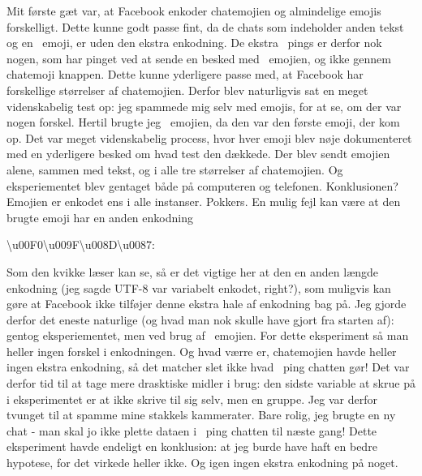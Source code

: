 \begin{article}
Mit første gæt var, at Facebook enkoder chatemojien og almindelige emojis forskelligt. Dette kunne godt passe fint, da de chats som indeholder anden tekst og en \coffee\ emoji, er uden den ekstra enkodning. De ekstra \coffee\ pings er derfor nok nogen, som har pinget ved at sende en besked med \coffee\ emojien, og ikke gennem chatemoji knappen.
Dette kunne yderligere passe med, at Facebook har forskellige størrelser af chatemojien.
Derfor blev naturligvis sat en meget videnskabelig test op: jeg spammede mig selv med emojis, for at se, om der var nogen forskel. Hertil brugte jeg \grapes\ emojien, da den var den første emoji, der kom op. Det var meget videnskabelig process, hvor hver emoji blev nøje dokumenteret med en yderligere besked om hvad test den dækkede. Der blev sendt emojien alene, sammen med tekst, og i alle tre størrelser af chatemojien. Og eksperiementet blev gentaget både på computeren og telefonen. Konklusionen? Emojien er enkodet ens i alle instanser. Pokkers.
En mulig fejl kan være at den brugte emoji har en anden enkodning 
\begin{center}
	\textbackslash u00F0\textbackslash u009F\textbackslash u008D\textbackslash u0087: \grapes
\end{center}
Som den kvikke læser kan se, så er det vigtige her at den en anden længde enkodning (jeg sagde UTF-8 var variabelt enkodet, right?), som muligvis kan gøre at Facebook ikke tilføjer denne ekstra hale af enkodning bag på.
Jeg gjorde derfor det eneste naturlige (og hvad man nok skulle have gjort fra starten af): gentog eksperiementet, men ved brug af \coffee\ emojien.
For dette eksperiment så man heller ingen forskel i enkodningen. Og hvad værre er, chatemojien havde heller ingen ekstra enkodning, så det matcher slet ikke hvad \coffee\ ping chatten gør!
Det var derfor tid til at tage mere drasktiske midler i brug: den sidste variable at skrue på i eksperimentet er at ikke skrive til sig selv, men en gruppe. Jeg var derfor tvunget til at spamme mine stakkels kammerater. Bare rolig, jeg brugte en ny chat - man skal jo ikke plette dataen i \coffee\ ping chatten til næste gang!
Dette eksperiment havde endeligt en konklusion: at jeg burde have haft en bedre hypotese, for det virkede heller ikke. Og igen ingen ekstra enkodning på noget.


\end{article}
